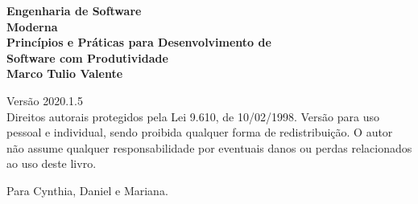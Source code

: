 \thispagestyle{empty}



\newpage
\thispagestyle{empty}
\vspace*{4cm}
\begin{center}
{\Huge \bf  Engenharia de Software\\[.3cm] Moderna}\\ 
\vspace*{1cm}
{\Large \bf  Princípios e Práticas para Desenvolvimento de\\[.3cm] Software com Produtividade}\\ 
\vspace*{3cm}
{\Large \bf Marco Tulio Valente}
\end{center}
\newpage

\newpage
\thispagestyle{empty}
\vspace*{3cm}
\begin{center}
{\Large  Versão 2020.1.5}\\ 
\vspace*{1cm}
{Direitos autorais protegidos pela Lei 9.610, de 10/02/1998. Versão para  uso pessoal e individual, sendo proibida qualquer forma de redistribuição. O autor não assume qualquer responsabilidade por eventuais danos ou perdas relacionados ao uso deste livro.}
\end{center}

\vspace*{3cm}




\newpage
\newpage

\thispagestyle{empty}
\vspace*{5cm}
\begin{center}
\large Para Cynthia, Daniel e Mariana.
\end{center}

\newpage
\newpage

\tableofcontents
